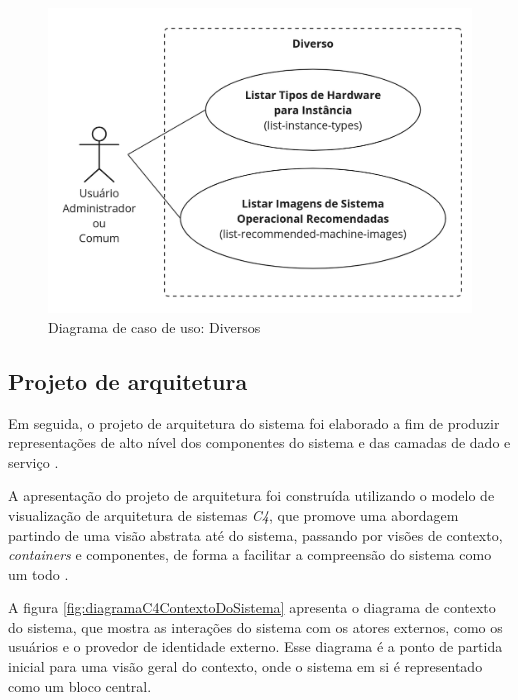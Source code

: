 \begin{figure}[H]
\caption{Diagrama de caso de uso: Diversos}
\label{fig:casoDeUsoDiversos}
\includegraphics[width=\textwidth]{capitulos/2-metodologia/files/use-case-misc.png}
\end{figure}

\subsection{Projeto de arquitetura}
\label{subsec:projetoDeArquitetura}

Em seguida, o projeto de arquitetura do sistema foi elaborado a fim de produzir representações de alto nível dos componentes do sistema e das camadas de dado e serviço \citep{pressman2016}.

A apresentação do projeto de arquitetura foi construída utilizando o modelo de visualização de arquitetura de sistemas \textit{C4}, que promove uma abordagem partindo de uma visão abstrata até do sistema, passando por visões de contexto, \textit{containers} e componentes, de forma a facilitar a compreensão do sistema como um todo \citep{brown2018}.

A figura \autoref{fig:diagramaC4ContextoDoSistema} apresenta o diagrama de contexto do sistema, que mostra as interações do sistema com os atores externos, como os usuários e o provedor de identidade externo. Esse diagrama é a ponto de partida inicial para uma visão geral do contexto, onde o sistema em si é representado como um bloco central.

